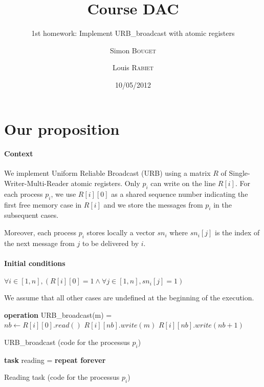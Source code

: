 \documentclass{scrartcl}
\title{Course DAC}
\subtitle{1st homework: Implement URB\_broadcast with atomic registers}
\author{Simon \textsc{Bouget} \and Louis \textsc{Rabiet}}
\date{10/05/2012}
\begin{document}
\maketitle


\section{Our proposition}

\paragraph{Context} We implement Uniform Reliable Broadcast (URB) using a matrix $R$ of Single-Writer-Multi-Reader atomic registers. Only $p_i$ can write on the line $R[i]$. For each process $p_i$, we use $R[i][0]$ as a shared sequence number indicating the first free memory case in $R[i]$ and we store the messages from $p_i$ in the subsequent cases.

Moreover, each process $p_i$ stores locally a vector $sn_i$ where $sn_i[j]$ is the index of the next message from $j$ to be delivered by $i$.

\paragraph{Initial conditions} $\forall i \in [1,n], ( R[i][0] = 1   \wedge  \forall j \in [1,n], sn_i[j] = 1)$

We assume that all other cases are undefined at the beginning of the execution.

\begin{algorithm}
\DontPrintSemicolon %
\textbf{operation} URB\_broadcast(m) = \\
   $nb \gets R[i][0].read()$\;
   $R[i][nb].write(m)$\;
   $R[i][nb].write(nb+1)$ 
\caption{{\sc URB\_broadcast} (code for the processus $p_i$)}
\label{algo:URBbroadcast}
\end{algorithm}


\begin{algorithm}[h!]
\DontPrintSemicolon %
\textbf{task} reading = \textbf{repeat forever} \\
\caption{{\sc Reading task} (code for the processus $p_i$)}
\label{algo:URBreading}
\end{algorithm}
\end{document}
